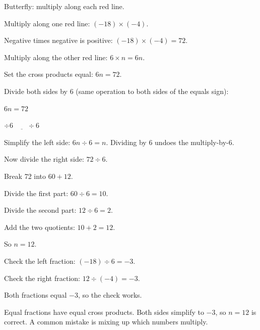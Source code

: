 \begin{center}
\par\smallskip
Butterfly: multiply along each red line.
\end{center}

\begin{steps}[resume]
  \item Multiply along one red line: $(-18) \times (-4)$.
  \item Negative times negative is positive: $(-18) \times (-4) = 72$.
  \item Multiply along the other red line: $6 \times n = 6n$.
  \item Set the cross products equal: $6n = 72$.
  \item Divide both sides by 6 (same operation to both sides of the equals sign):
    \begin{center}
      $6n = 72$
      \par\smallskip
      $\underline{\div 6 \qquad \div 6}$
    \end{center}
  \item Simplify the left side: $6n \div 6 = n$. Dividing by 6 undoes the multiply-by-6.
  \item Now divide the right side: $72 \div 6$.
  \item Break 72 into $60 + 12$.
  \item Divide the first part: $60 \div 6 = 10$.
  \item Divide the second part: $12 \div 6 = 2$.
  \item Add the two quotients: $10 + 2 = 12$.
  \item So $n = 12$.
  \item Check the left fraction: $(-18) \div 6 = -3$.
  \item Check the right fraction: $12 \div (-4) = -3$.
  \item Both fractions equal $-3$, so the check works.
\end{steps}


\noindent Equal fractions have equal cross products. Both sides simplify to $-3$, so $n = 12$ is correct. A common mistake is mixing up which numbers multiply.
